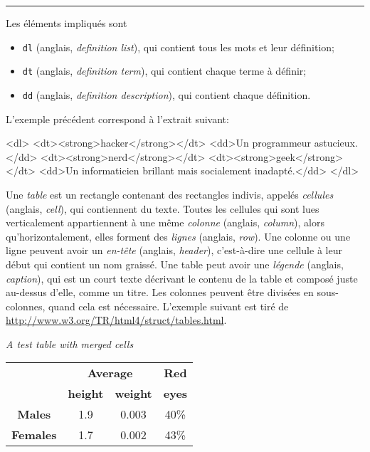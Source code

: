 \noindent\rule{\linewidth}{0.5pt}
Les éléments impliqués sont
\begin{itemize}

  \item \texttt{dl} (anglais, \emph{definition list}), qui contient
   tous les mots et leur définition;

  \item \texttt{dt} (anglais, \emph{definition term}), qui contient
   chaque terme à définir;

  \item \texttt{dd} (anglais, \emph{definition description}), qui
    contient chaque définition.

\end{itemize}
L'exemple précédent correspond à l'extrait \HTML suivant:
\begin{sverb}
<dl>
  <dt><strong>hacker</strong></dt>
    <dd>Un programmeur astucieux.</dd>
  <dt><strong>nerd</strong></dt>
  <dt><strong>geek</strong></dt>
    <dd>Un informaticien brillant mais socialement inadapté.</dd>
</dl>
\end{sverb}
Une \emph{table} est un rectangle contenant des rectangles indivis,
appelés \emph{cellules} (anglais, \emph{cell}), qui contiennent du
texte. Toutes les cellules qui sont lues verticalement appartiennent à
une même \emph{colonne} (anglais, \emph{column}), alors
qu'horizontalement, elles forment des \emph{lignes} (anglais,
\emph{row}). Une colonne ou une ligne peuvent avoir un \emph{en-tête}
(anglais, \emph{header}), c'est-à-dire une cellule à leur début qui
contient un nom graissé. Une table peut avoir une \emph{légende}
(anglais, \emph{caption}), qui est un court texte décrivant le contenu
de la table et composé juste au-dessus d'elle, comme un titre. Les
colonnes peuvent être divisées en sous-colonnes, quand cela est
nécessaire. L'exemple suivant est tiré de
\url{http://www.w3.org/TR/html4/struct/tables.html}.
\begin{center}
\emph{A test table with merged cells}\\

\begin{tabular}{|c|c|c|c|}
\hline
                 & \multicolumn{2}{|c|}{\textbf{Average}} & \textbf{Red}\\
\cline{2-3}
                 & \textbf{height}    &   \textbf{weight} & \textbf{eyes}\\
\hline
\textbf{Males}   & 1.9                & 0.003             & 40\%\\
\hline
\textbf{Females} & 1.7                & 0.002             & 43\%\\
\hline
\end{tabular}
\end{center}

